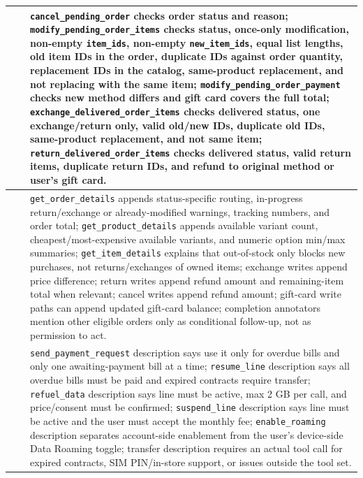 \begin{table}[t]
\begin{tabular}{>{\centering\arraybackslash}m{}>{\centering\arraybackslash}m{}p{}}
\cmidrule(lr){2-3}
& \multirow{7}{*}{Action Realization Layer}
& \texttt{cancel\_pending\_order} checks order status and reason; \texttt{modify\_pending\_order\_items}
checks status, once-only modification, non-empty \texttt{item\_ids}, non-empty
\texttt{new\_item\_ids}, equal list lengths, old item IDs in the order, duplicate
IDs against order quantity, replacement IDs in the catalog, same-product
replacement, and not replacing with the same item; \texttt{modify\_pending\_order\_payment}
checks new method differs and gift card covers the full total; \texttt{exchange\_delivered\_order\_items}
checks delivered status, one exchange/return only, valid old/new IDs, duplicate
old IDs, same-product replacement, and not same item; \texttt{return\_delivered\_order\_items}
checks delivered status, valid return items, duplicate return IDs, and refund to
original method or user's gift card. \\
\cmidrule(lr){2-3}
& \multirow{7}{*}{Trajectory Regulation Layer}
& \texttt{get\_order\_details} appends status-specific routing, in-progress return/exchange
or already-modified warnings, tracking numbers, and order total; \texttt{get\_product\_details}
appends available variant count, cheapest/most-expensive available variants, and
numeric option min/max summaries; \texttt{get\_item\_details} explains that out-of-stock
only blocks new purchases, not returns/exchanges of owned items; exchange writes
append price difference; return writes append refund amount and remaining-item
total when relevant; cancel writes append refund amount; gift-card write paths
can append updated gift-card balance; completion annotators mention other
eligible orders only as conditional follow-up, not as permission to act. \\
\midrule
\multirow{28}{*}{\centering Telecom}
& \multirow{6}{*}{Environment Contract Layer}
& \texttt{send\_payment\_request} description says use it only for overdue bills and only
one awaiting-payment bill at a time; \texttt{resume\_line} description says all overdue
bills must be paid and expired contracts require transfer; \texttt{refuel\_data}
description says line must be active, max 2 GB per call, and price/consent must
be confirmed; \texttt{suspend\_line} description says line must be active and the user
must accept the monthly fee; \texttt{enable\_roaming} description separates account-side
enablement from the user's device-side Data Roaming toggle; transfer description
requires an actual tool call for expired contracts, SIM PIN/in-store support, or
issues outside the tool set. \\

\end{tabular}
\end{table}
